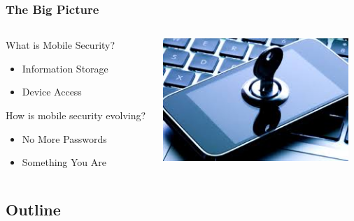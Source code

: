 \documentclass{beamer}
\begin{document}
\begin{frame}
  \frametitle{The Big Picture}
  
  \begin{columns}
  \begin{column}{0.6\textwidth}
  What is Mobile Security?
     \begin{itemize}
     \item Information Storage
  	  \item Device Access 
  	  \linebreak
     \end{itemize}
     
  How is mobile security evolving?
     \begin{itemize}
     \item No More Passwords
	  \item Something You Are
     \end{itemize}
  \end{column}
  \begin{column}{0.4\textwidth}
   \includegraphics[width=0.95\textwidth]{Illustrations/mobileSecurity.jpg}
       \\
  \end{column}
  \end{columns}
\end{frame}

\subsection*{Outline}
\end{document}
